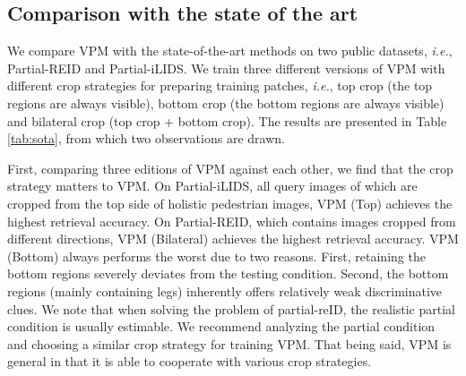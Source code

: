 \documentclass[10pt,twocolumn,letterpaper]{article}
\begin{document}
\subsection{Comparison with the state of the art}\label{sec:sota}
We compare VPM with the state-of-the-art methods on two public datasets, \emph{i.e.}, Partial-REID and Partial-iLIDS. We train three different versions of VPM with different crop strategies for preparing training patches, \emph{i.e.}, top crop (the top regions are always visible), bottom crop (the bottom regions are always visible) and bilateral crop (top crop + bottom crop).  The results are presented in Table \ref{tab:sota}, from which two observations are drawn. 


First, comparing three editions of VPM against each other, we find that the crop strategy matters to VPM. On Partial-iLIDS, all query images of which are cropped from the top side of holistic pedestrian images, VPM (Top) achieves the highest retrieval accuracy. On Partial-REID, which contains images cropped from different directions, VPM (Bilateral) achieves the highest retrieval accuracy.  VPM (Bottom) always performs the worst due to two reasons. First, retaining the bottom regions severely deviates from the testing condition. Second, the bottom regions (mainly containing legs) inherently offers relatively weak discriminative clues. We note that when solving the problem of partial-reID, the realistic partial condition is usually estimable. We recommend analyzing the partial condition and choosing a similar crop strategy for training VPM. That being said, VPM is general in that it is able to cooperate with various crop strategies. 
\end{document}
